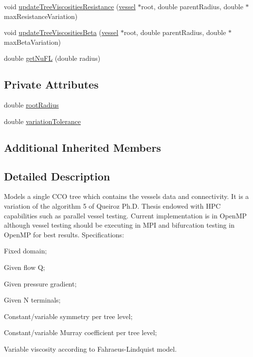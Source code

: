 \begin{DoxyCompactItemize}
void \mbox{\hyperlink{class_fixed_radius_root_variable_viscosity_c_c_o_tree_acd33c31bbe3a009b3baccf92cc8a13d9}{update\+Tree\+Viscosities\+Resistance}} (\mbox{\hyperlink{structvessel}{vessel}} $\ast$root, double parent\+Radius, double $\ast$max\+Resistance\+Variation)
\item 
void \mbox{\hyperlink{class_fixed_radius_root_variable_viscosity_c_c_o_tree_a1b03973f177c02ef19121578b4c5e625}{update\+Tree\+Viscosities\+Beta}} (\mbox{\hyperlink{structvessel}{vessel}} $\ast$root, double parent\+Radius, double $\ast$max\+Beta\+Variation)
\item 
double \mbox{\hyperlink{class_fixed_radius_root_variable_viscosity_c_c_o_tree_ad857abeaf2feb93167d4d32ef8a8ae24}{get\+Nu\+FL}} (double radius)
\end{DoxyCompactItemize}
\subsection*{Private Attributes}
\begin{DoxyCompactItemize}
\item 
double \mbox{\hyperlink{class_fixed_radius_root_variable_viscosity_c_c_o_tree_a7a804189732bccc4ab8bbf7ca775a6ac}{root\+Radius}}
\item 
double \mbox{\hyperlink{class_fixed_radius_root_variable_viscosity_c_c_o_tree_aecf5d6b1ec4c8ddfc9fe331ce5ec6a87}{variation\+Tolerance}}
\end{DoxyCompactItemize}
\subsection*{Additional Inherited Members}


\subsection{Detailed Description}
Models a single C\+CO tree which contains the vessel\textquotesingle{}s data and connectivity. It is a variation of the algorithm 5 of Queiroz Ph.\+D. Thesis endowed with H\+PC capabilities such as parallel vessel testing. Current implementation is in Open\+MP although vessel testing should be executing in M\+PI and bifurcation testing in Open\+MP for best results. Specifications\+:
\begin{DoxyItemize}
\item Fixed domain;
\item Given flow Q;
\item Given pressure gradient;
\item Given N terminals;
\item Constant/variable symmetry per tree level;
\item Constant/variable Murray coefficient per tree level;
\item Variable viscosity according to Fahraeus-\/\+Lindquist model. 
\end{DoxyItemize}

